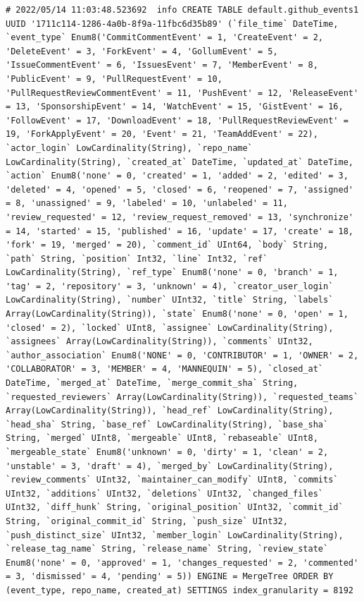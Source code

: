 \begin{verbatim}
# 2022/05/14 11:03:48.523692  info CREATE TABLE default.github_events1 UUID '1711c114-1286-4a0b-8f9a-11fbc6d35b89' (`file_time` DateTime, `event_type` Enum8('CommitCommentEvent' = 1, 'CreateEvent' = 2, 'DeleteEvent' = 3, 'ForkEvent' = 4, 'GollumEvent' = 5, 'IssueCommentEvent' = 6, 'IssuesEvent' = 7, 'MemberEvent' = 8, 'PublicEvent' = 9, 'PullRequestEvent' = 10, 'PullRequestReviewCommentEvent' = 11, 'PushEvent' = 12, 'ReleaseEvent' = 13, 'SponsorshipEvent' = 14, 'WatchEvent' = 15, 'GistEvent' = 16, 'FollowEvent' = 17, 'DownloadEvent' = 18, 'PullRequestReviewEvent' = 19, 'ForkApplyEvent' = 20, 'Event' = 21, 'TeamAddEvent' = 22), `actor_login` LowCardinality(String), `repo_name` LowCardinality(String), `created_at` DateTime, `updated_at` DateTime, `action` Enum8('none' = 0, 'created' = 1, 'added' = 2, 'edited' = 3, 'deleted' = 4, 'opened' = 5, 'closed' = 6, 'reopened' = 7, 'assigned' = 8, 'unassigned' = 9, 'labeled' = 10, 'unlabeled' = 11, 'review_requested' = 12, 'review_request_removed' = 13, 'synchronize' = 14, 'started' = 15, 'published' = 16, 'update' = 17, 'create' = 18, 'fork' = 19, 'merged' = 20), `comment_id` UInt64, `body` String, `path` String, `position` Int32, `line` Int32, `ref` LowCardinality(String), `ref_type` Enum8('none' = 0, 'branch' = 1, 'tag' = 2, 'repository' = 3, 'unknown' = 4), `creator_user_login` LowCardinality(String), `number` UInt32, `title` String, `labels` Array(LowCardinality(String)), `state` Enum8('none' = 0, 'open' = 1, 'closed' = 2), `locked` UInt8, `assignee` LowCardinality(String), `assignees` Array(LowCardinality(String)), `comments` UInt32, `author_association` Enum8('NONE' = 0, 'CONTRIBUTOR' = 1, 'OWNER' = 2, 'COLLABORATOR' = 3, 'MEMBER' = 4, 'MANNEQUIN' = 5), `closed_at` DateTime, `merged_at` DateTime, `merge_commit_sha` String, `requested_reviewers` Array(LowCardinality(String)), `requested_teams` Array(LowCardinality(String)), `head_ref` LowCardinality(String), `head_sha` String, `base_ref` LowCardinality(String), `base_sha` String, `merged` UInt8, `mergeable` UInt8, `rebaseable` UInt8, `mergeable_state` Enum8('unknown' = 0, 'dirty' = 1, 'clean' = 2, 'unstable' = 3, 'draft' = 4), `merged_by` LowCardinality(String), `review_comments` UInt32, `maintainer_can_modify` UInt8, `commits` UInt32, `additions` UInt32, `deletions` UInt32, `changed_files` UInt32, `diff_hunk` String, `original_position` UInt32, `commit_id` String, `original_commit_id` String, `push_size` UInt32, `push_distinct_size` UInt32, `member_login` LowCardinality(String), `release_tag_name` String, `release_name` String, `review_state` Enum8('none' = 0, 'approved' = 1, 'changes_requested' = 2, 'commented' = 3, 'dismissed' = 4, 'pending' = 5)) ENGINE = MergeTree ORDER BY (event_type, repo_name, created_at) SETTINGS index_granularity = 8192

\end{verbatim}
